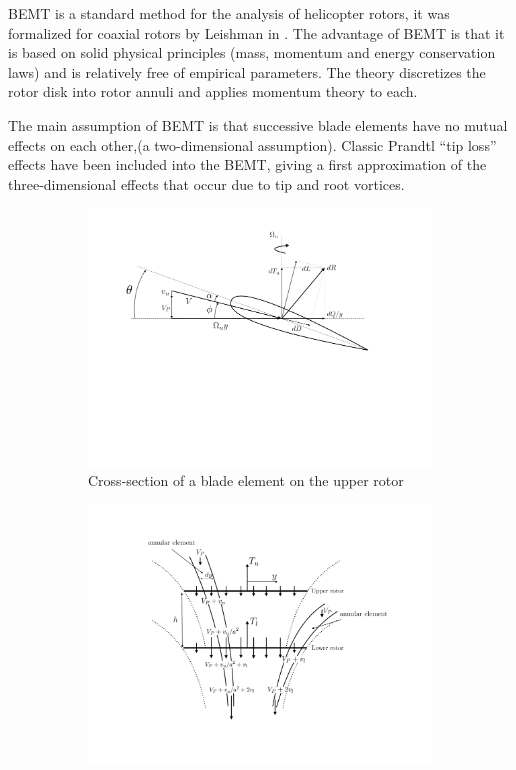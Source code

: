 BEMT is a standard method for the analysis of helicopter rotors, it was formalized for coaxial rotors by Leishman in \cite{BEMT}. The advantage of BEMT is that it is based on solid physical principles (mass, momentum and energy conservation laws) and is relatively free of empirical parameters. The theory discretizes the rotor disk into rotor annuli and applies momentum theory to each.

The main assumption of BEMT is that successive blade elements have no mutual effects on each other,(a two-dimensional assumption). Classic Prandtl “tip loss” effects have been included into the BEMT, giving a first approximation of the three-dimensional effects that occur due to tip and root vortices.


\begin{figure}[H]
\captionsetup[subfigure]{justification=centering}
\begin{subfigure}[t]{0.5\textwidth}
    \centering
    \includegraphics[width=\textwidth]{Figures/blade_axial.pdf}
    \caption{Cross-section of a blade element on the upper rotor}
    \label{fig:blade2d}
\end{subfigure}
\begin{subfigure}[t]{0.5\textwidth}
    \centering
    \includegraphics[width=\textwidth]{Figures/disk2D_BEM_axial.pdf}

\end{subfigure}
\end{figure}
